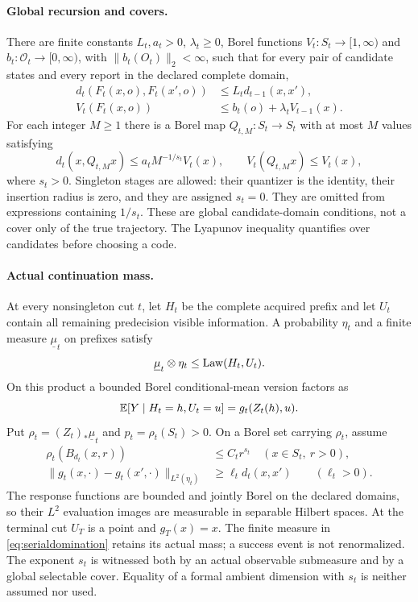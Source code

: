\paragraph{Global recursion and covers.}
There are finite constants $L_t,a_t>0$, $\lambda_t\ge0$, Borel functions $V_t:S_t\to[1,\infty)$ and $b_t:\mathcal O_t\to[0,\infty)$, with $\|b_t(O_t)\|_2<\infty$, such that for every pair of candidate states and every report in the declared complete domain,
\begin{align}
 d_t(F_t(x,o),F_t(x',o))&\le L_t d_{t-1}(x,x'),\label{eq:seriallip}\\
 V_t(F_t(x,o))&\le b_t(o)+\lambda_t V_{t-1}(x).\label{eq:seriallyap}
\end{align}
For each integer $M\ge1$ there is a Borel map $Q_{t,M}:S_t\to S_t$ with at most $M$ values satisfying
\begin{equation}\label{eq:serialcover}
 d_t(x,Q_{t,M}x)\le a_t M^{-1/s_t}V_t(x),\qquad
 V_t(Q_{t,M}x)\le V_t(x),
\end{equation}
where $s_t>0$. Singleton stages are allowed: their quantizer is the identity, their insertion radius is zero, and they are assigned $s_t=0$. They are omitted from expressions containing $1/s_t$. These are global candidate-domain conditions, not a cover only of the true trajectory. The Lyapunov inequality quantifies over candidates before choosing a code.

\paragraph{Actual continuation mass.}
At every nonsingleton cut $t$, let $H_t$ be the complete acquired prefix and let $U_t$ contain all remaining predecision visible information. A probability $\eta_t$ and a finite measure $\underline\mu_t$ on prefixes satisfy
\begin{equation}\label{eq:serialdomination}
 \underline\mu_t\otimes\eta_t\le\operatorname{Law}(H_t,U_t).
\end{equation}
On this product a bounded Borel conditional-mean version factors as
\[
 \mathbb E[Y\mid H_t=h,U_t=u]=g_t(Z_t(h),u).
\]
Put $\rho_t=(Z_t)_*\underline\mu_t$ and $p_t=\rho_t(S_t)>0$. On a Borel set carrying $\rho_t$, assume
\begin{align}
 \rho_t(B_{d_t}(x,r))&\le C_t r^{s_t}\quad(x\in S_t,\ r>0),\label{eq:serialmass}\\
 \|g_t(x,\cdot)-g_t(x',\cdot)\|_{L^2(\eta_t)}
 &\ge \ell_t d_t(x,x')\qquad(\ell_t>0).\label{eq:serialobservable}
\end{align}
The response functions are bounded and jointly Borel on the declared domains, so their $L^2$ evaluation images are measurable in separable Hilbert spaces. At the terminal cut $U_T$ is a point and $g_T(x)=x$. The finite measure in \eqref{eq:serialdomination} retains its actual mass; a success event is not renormalized. The exponent $s_t$ is witnessed both by an actual observable submeasure and by a global selectable cover. Equality of a formal ambient dimension with $s_t$ is neither assumed nor used.

